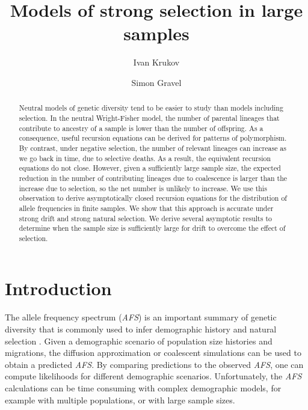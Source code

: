\documentclass[review]{elsarticle}
\begin{document}
\begin{frontmatter}
  \title{Models of strong selection in large samples}

  \author{Ivan Krukov}
  \author{Simon Gravel}

  \begin{abstract}
    Neutral models of genetic diversity tend to be easier to study than models including selection.
    In the neutral Wright-Fisher model, the number of parental lineages that contribute to ancestry
    of a sample is lower than the number of offspring. As a consequence, useful recursion equations
    can be derived for patterns of polymorphism. By contrast, under negative selection, the number
    of relevant lineages can increase as we go back in time, due to selective deaths. As a result,
    the equivalent recursion equations do not close. However, given a sufficiently large sample
    size, the expected reduction in the number of contributing lineages due to coalescence is larger
    than the increase due to selection, so the net number is unlikely to increase. We use this
    observation to derive asymptotically closed recursion equations for the distribution of allele
    frequencies in finite samples. We show that this approach is accurate under strong drift and
    strong natural selection. We derive several asymptotic results to determine when the sample size
    is sufficiently large for drift to overcome the effect of selection.
  \end{abstract}

\end{frontmatter}

\section{Introduction}
\label{sec:introduciton}

The allele frequency spectrum (\textit{AFS}) is an important summary of genetic diversity that is
commonly used to infer demographic history and natural selection \citep{GutenkunstEtAl2009}. Given a
demographic scenario of population size histories and migrations, the diffusion approximation or
coalescent simulations can be used to obtain a predicted \textit{AFS}. By comparing predictions to
the observed \textit{AFS}, one can compute likelihoods for different demographic scenarios.
Unfortunately, the \textit{AFS} calculations can be time consuming with complex demographic models,
for example with multiple populations, or with large sample sizes.
\end{document}
